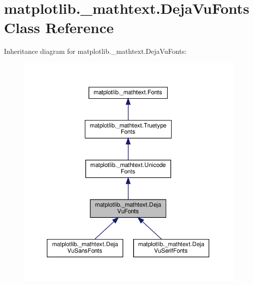 \hypertarget{classmatplotlib_1_1__mathtext_1_1DejaVuFonts}{}\section{matplotlib.\+\_\+mathtext.\+Deja\+Vu\+Fonts Class Reference}
\label{classmatplotlib_1_1__mathtext_1_1DejaVuFonts}


Inheritance diagram for matplotlib.\+\_\+mathtext.\+Deja\+Vu\+Fonts\+:
\nopagebreak
\begin{figure}[H]
\begin{center}
\leavevmode
\includegraphics[width=350pt]{classmatplotlib_1_1__mathtext_1_1DejaVuFonts__inherit__graph}
\end{center}
\end{figure}



